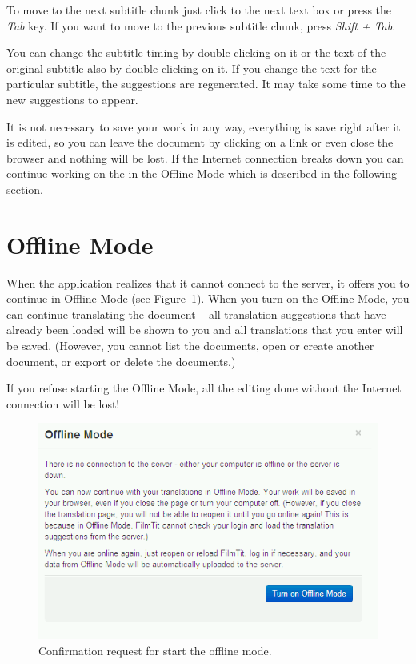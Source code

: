 To move to the next subtitle chunk just click to the next text box or press the \emph{Tab} key. If you want to move to the previous subtitle chunk, press \emph{Shift + Tab}.

You can change the subtitle timing by double-clicking on it or the text of the original subtitle also by double-clicking on it. If you change the text for the particular subtitle, the suggestions are regenerated. It may take some time to the new suggestions to appear.

It is not necessary to save your work in any way, everything is save right after it is edited, so you can leave the document by clicking on a link or even close the browser and nothing will be lost. If the Internet connection breaks down you can continue working on the in the Offline Mode which is described in the following section.

\section{Offline Mode}
\label{um:sec:offlinemode}

When the application realizes that it cannot connect to the server, it offers you to continue in Offline Mode (see Figure~\ref{fig:start_offline_mode}). When you turn on the Offline Mode, you can continue translating the document -- all translation suggestions that have already been loaded will be shown to you and all translations that you enter will be saved.
(However, you cannot list the documents, open or create another document, or export or delete the documents.)


If you refuse starting the Offline Mode, all the editing done without the Internet connection will be lost!

\begin{figure}[h]
\begin{center}
\includegraphics[scale=0.4]{figures/user_manual/offline_mode.png}
\end{center}
\caption{Confirmation request for start the offline mode.}
\label{fig:start_offline_mode}
\end{figure}

